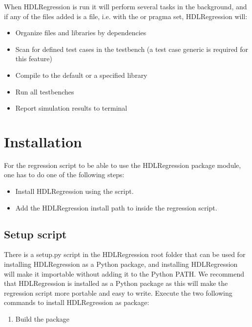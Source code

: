 \documentclass[letterpaper,10pt,english]{sphinxmanual}
\begin{document}
\sphinxAtStartPar
When HDLRegression is run it will perform several tasks in the background, and if any of the files added is a {\hyperref[\detokenize{intro:testbench}]{}} file,
i.e. with the   or   pragma set, HDLRegression will:
\begin{itemize}
\item {} 
\sphinxAtStartPar
Organize files and libraries by dependencies

\item {} 
\sphinxAtStartPar
Scan for defined test cases in the testbench (a test case generic is required for this feature)

\item {} 
\sphinxAtStartPar
Compile to the default or a specified library

\item {} 
\sphinxAtStartPar
Run all testbenches

\item {} 
\sphinxAtStartPar
Report simulation results to terminal

\end{itemize}


\chapter{Installation}
\label{\detokenize{intro:installation}}
\sphinxAtStartPar
For the regression script to be able to use the HDLRegression package module,
one has to do one of the following steps:
\begin{itemize}
\item {} 
\sphinxAtStartPar
Install HDLRegression using the {\hyperref[\detokenize{intro:setup-py}]{}} script.

\item {} 
\sphinxAtStartPar
Add the HDLRegression install path to {\hyperref[\detokenize{intro:python-path}]{}} inside the regression script.

\end{itemize}


\section{Setup script}
\label{\detokenize{intro:setup-script}}\label{\detokenize{intro:setup-py}}
\sphinxAtStartPar
There is a setup.py script in the HDLRegression root folder that can be used for installing HDLRegression as a
Python package, and installing HDLRegression will make it importable without adding it to the Python PATH.
We recommend that HDLRegression is installed as a Python package as this will make the regression script more
portable and easy to write.
Execute the two following commands to install HDLRegression as package:
\begin{enumerate}
%
\item {} 
\sphinxAtStartPar
Build the package

\end{enumerate}
\end{document}
